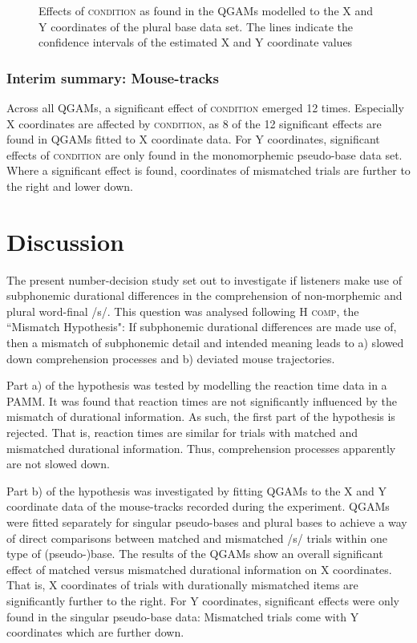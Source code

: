 \begin{figure}
    \centering
    
    \caption{Effects of \textsc{condition} as found in the QGAMs modelled to the X and Y coordinates of the plural base data set. The lines indicate the confidence intervals of the estimated X and Y coordinate values}
    \label{fig:7_11}
\end{figure}

\subsubsection{Interim summary: Mouse-tracks}\label{section07_2_3_3}

Across all QGAMs, a significant effect of \textsc{condition} emerged 12 times. Especially X coordinates are affected by \textsc{condition}, as 8 of the 12 significant effects are found in QGAMs fitted to X coordinate data. For Y coordinates, significant effects of \textsc{condition} are only found in the monomorphemic pseudo-base data set. Where a significant effect is found, coordinates of mismatched trials are further to the right and lower down.

\section{Discussion}\label{section07_3}

The present number-decision study set out to investigate if listeners make use of subphonemic durational differences in the comprehension of non-morphemic and plural word-final /s/. This question was analysed following \textsc{H comp}, the ``Mismatch Hypothesis": If subphonemic durational differences are made use of, then a mismatch of subphonemic detail and intended meaning leads to a) slowed down comprehension processes and b) deviated mouse trajectories.

Part a) of the hypothesis was tested by modelling the reaction time data in a PAMM. It was found that reaction times are not significantly influenced by the mismatch of durational information. As such, the first part of the hypothesis is rejected. That is, reaction times are similar for trials with matched and mismatched durational information. Thus, comprehension processes apparently are not slowed down.

Part b) of the hypothesis was investigated by fitting QGAMs to the X and Y coordinate data of the mouse-tracks recorded during the experiment. QGAMs were fitted separately for singular pseudo-bases and plural bases to achieve a way of direct comparisons between matched and mismatched /s/ trials within one type of (pseudo-)base. The results of the QGAMs show an overall significant effect of matched versus mismatched durational information on X coordinates. That is, X coordinates of trials with durationally mismatched items are significantly further to the right. For Y coordinates, significant effects were only found in the singular pseudo-base data: Mismatched trials come with Y coordinates which are further down. 

